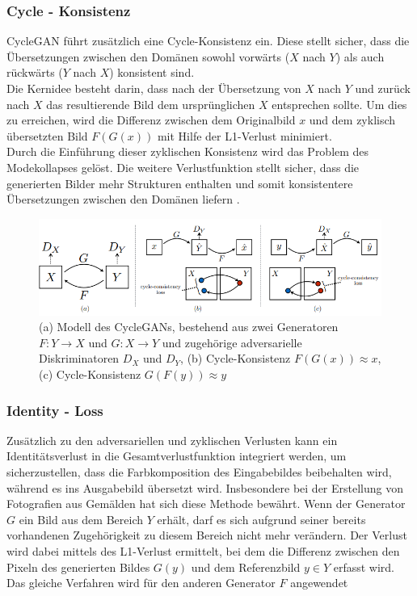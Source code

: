 \subsubsection{Cycle - Konsistenz}
CycleGAN führt zusätzlich eine Cycle-Konsistenz ein. Diese stellt sicher, dass die Übersetzungen zwischen den Domänen sowohl vorwärts ($X$ nach $Y$) als auch rückwärts ($Y$ nach $X$) konsistent sind.
\\
Die Kernidee besteht darin, dass nach der Übersetzung von $X$ nach $Y$ und zurück nach $X$ das resultierende Bild dem ursprünglichen $X$ entsprechen sollte. Um dies zu erreichen, wird die Differenz zwischen dem Originalbild $x$ und dem zyklisch übersetzten Bild $F(G(x))$ mit Hilfe der L1-Verlust minimiert. 
\\
Durch die Einführung dieser zyklischen Konsistenz wird das Problem des Modekollapses gelöst. Die weitere Verlustfunktion stellt sicher, dass die generierten Bilder mehr Strukturen enthalten und somit konsistentere Übersetzungen zwischen den Domänen liefern \cite{Zhu.2017}.

\begin{figure}[h]
	\centering
	\includegraphics[width=1\linewidth]{./images/cycle_consistency_loss.png}
	\caption{(a) Modell des CycleGANs, bestehend aus zwei Generatoren $F:Y\rightarrow X$ und $G:X \rightarrow Y$ und zugehörige adversarielle Diskriminatoren $D_X$ und $D_Y$,
     (b) Cycle-Konsistenz $F(G(x))\approx x$,
     (c) Cycle-Konsistenz $G(F(y))\approx y$\cite{Zhu.2017}}
	\label{fig:cycleConsistency}
\end{figure}

\subsubsection{Identity - Loss}
Zusätzlich zu den adversariellen und zyklischen Verlusten kann ein Identitätsverlust in die Gesamtverlustfunktion integriert werden, um sicherzustellen, dass die Farbkomposition des Eingabebildes beibehalten wird, während es ins Ausgabebild übersetzt wird. Insbesondere bei der Erstellung von Fotografien aus Gemälden hat sich diese Methode bewährt.  
Wenn der Generator $G$ ein Bild aus dem Bereich $Y$ erhält, darf es sich aufgrund seiner bereits vorhandenen Zugehörigkeit zu diesem Bereich nicht mehr verändern. 
Der Verlust wird dabei mittels des L1-Verlust ermittelt, bei dem die Differenz zwischen den Pixeln des generierten Bildes $G(y)$ und dem Referenzbild $y\in Y$ erfasst wird. Das gleiche Verfahren wird für den anderen Generator $F$ angewendet \cite{Zhu.2017}

